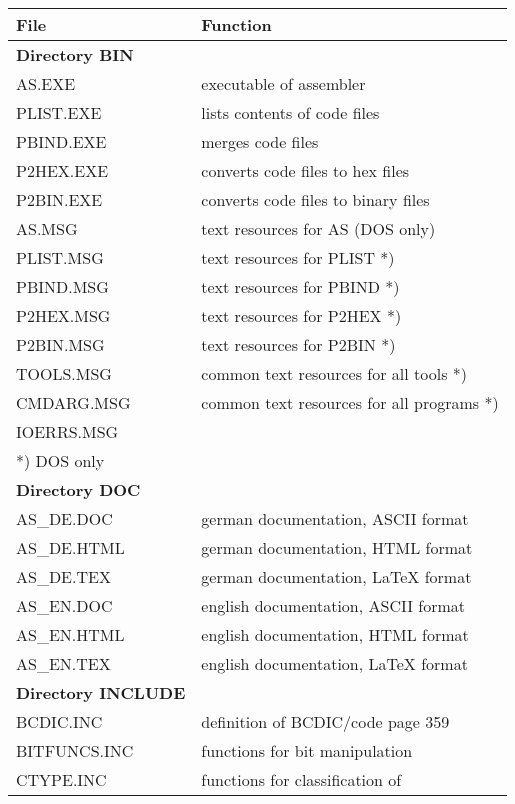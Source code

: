 \documentclass[12pt,twoside]{report}
\newcommand{\asname}{{AS}}
\begin{document}
\begin{center}\begin{longtable}{|l|l|}
\hline
File              & Function \\
\hline
\hline
\endhead
{\bf Directory BIN} & \\
\hline
AS.EXE            & executable of assembler \\
PLIST.EXE         & lists contents of code files \\
PBIND.EXE         & merges code files \\
P2HEX.EXE         & converts code files to hex files \\
P2BIN.EXE         & converts code files to binary files \\
AS.MSG            & text resources for \asname{} (DOS only) \\
PLIST.MSG         & text resources for PLIST *) \\
PBIND.MSG         & text resources for PBIND *) \\
P2HEX.MSG         & text resources for P2HEX *) \\
P2BIN.MSG         & text resources for P2BIN *) \\
TOOLS.MSG         & common text resources for all tools *) \\
CMDARG.MSG        & common text resources for all programs *) \\
IOERRS.MSG        & \\
\hline
\multicolumn{2}{|l|}{*) DOS only} \\
\hline
{\bf Directory DOC} & \\
\hline
AS\_DE.DOC        & german documentation, ASCII format \\
AS\_DE.HTML       & german documentation, HTML format \\
AS\_DE.TEX        & german documentation, LaTeX format \\
AS\_EN.DOC        & english documentation, ASCII format \\
AS\_EN.HTML       & english documentation, HTML format \\
AS\_EN.TEX        & english documentation, LaTeX format \\
\hline
{\bf Directory INCLUDE} & \\
\hline
BCDIC.INC         & definition of BCDIC/code page 359 \\
BITFUNCS.INC      & functions for bit manipulation \\
CTYPE.INC         & functions for classification of \\

\end{longtable}
\end{center}
\end{document}
